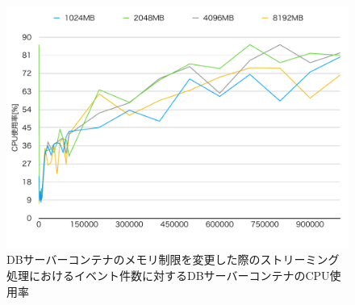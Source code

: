 \documentclass[../../../../../main]{subfiles}
\begin{document}
    \begin{figure}[H]
        \centering
        \includegraphics[width=12cm]{graph}
        \caption{DBサーバーコンテナのメモリ制限を変更した際のストリーミング処理におけるイベント件数に対するDBサーバーコンテナのCPU使用率}
        \label{fig:stream-change-db-memory-limit-db-cpu-app_4_8192-db_400}
    \end{figure}
\end{document}
